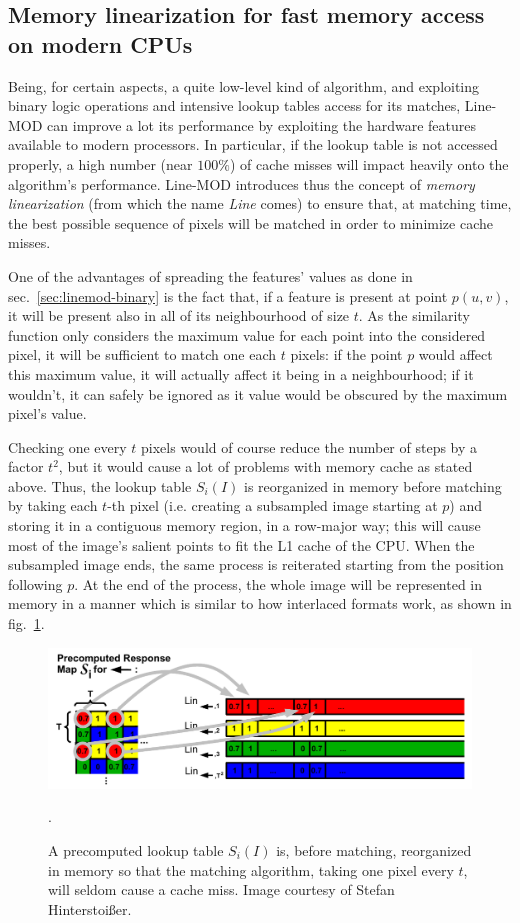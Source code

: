 \subsection{Memory linearization for fast memory access on modern
  CPUs}
Being, for certain aspects, a quite low-level kind of algorithm, and
exploiting binary logic operations and intensive lookup tables access
for its matches, Line-MOD can improve a lot its performance by
exploiting the hardware features available to modern processors. In
particular, if the lookup table is not accessed properly, a high
number (near $100\unit{\%}$) of cache misses will impact heavily onto
the algorithm's performance. Line-MOD introduces thus the concept of
\emph{memory linearization} (from which the name \emph{Line} comes) to
ensure that, at matching time, the best possible sequence of pixels
will be matched in order to minimize cache misses.

One of the advantages of spreading the features' values as done in
sec.~\ref{sec:linemod-binary} is the fact that, if a feature is
present at point $p(u,v)$, it will be present also in all of its
neighbourhood of size $t$. As the similarity function only considers the maximum
value for each point into the considered pixel, it will be sufficient
to match one each $t$ pixels: if the point $p$ would affect this
maximum value, it will actually affect it being in a neighbourhood; if
it wouldn't, it can safely be ignored as it value would be obscured by
the maximum pixel's value.

Checking one every $t$ pixels would of course reduce the number of
steps by a factor $t^2$, but it would cause a lot of problems with
memory cache as stated above. Thus, the lookup table $S_i(I)$ is
reorganized in memory before matching by taking each $t$-th
pixel (i.e. creating a subsampled image starting at $p$) and storing it in a contiguous memory region, in a row-major
way; this will cause most of the image's salient points to fit the L1
cache of the CPU. When the subsampled image ends, the same process is
reiterated starting from the position following $p$. At the end of the
process, the whole image will be represented in memory in a manner
which is similar to how interlaced formats work, as shown in fig.~\ref{fig:linemod-linearize}.

\begin{figure}[htbp]
\centering
\includegraphics[width=5in]{./Graphics/linemod-linearize}
\caption{A precomputed lookup table $S_i(I)$ is, before matching,
  reorganized in memory so that the matching algorithm, taking one
  pixel every $t$, will seldom cause a cache miss. Image courtesy of Stefan Hinterstoi\ss er.\label{fig:linemod-linearize}}.
\end{figure}
